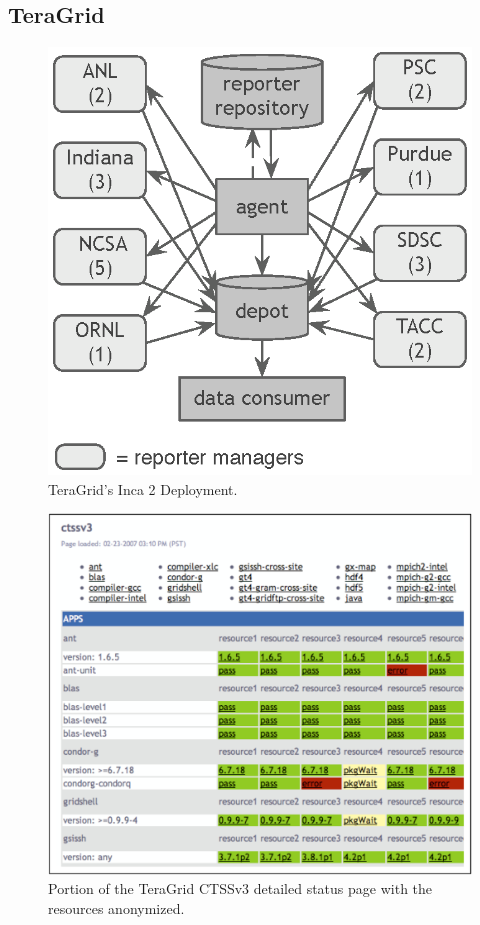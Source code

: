\documentclass{sig-alternate}
\begin{document}
\subsection{TeraGrid}

\begin{figure}[tbp]
  \centering
  \includegraphics[width=.8\columnwidth]{tg-deploy.eps}
  \caption{\label{tg_deploy_fig} TeraGrid's Inca 2 Deployment.}
\end{figure}

\begin{figure}[tbp]
  \centering
  \includegraphics[width=.75\textwidth]{status-page.eps}
  \caption{\label{status_page_fig} Portion of the TeraGrid CTSSv3 detailed status page with the resources anonymized.}
\end{figure}
\end{document}

